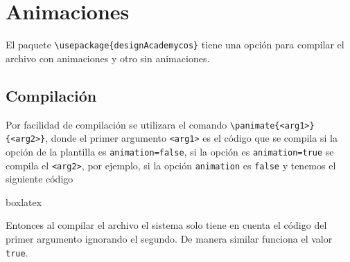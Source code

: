 {\justifying
\chapter{Animaciones}\label{cap:Animaciones}
%
	El paquete \verb|\usepackage{designAcademycos}| tiene una opción para compilar el archivo con animaciones y otro sin animaciones.
	\section{Compilación}
	Por facilidad de compilación se utilizara el comando \verb|\panimate{<arg1>}{<arg2>}|, donde el primer argumento \verb|<arg1>| es el código que se compila si la opción de la plantilla es \verb|animation=false|, si la opción es \verb|animation=true| se compila el \verb|<arg2>|, por ejemplo, si la opción \verb|animation| es \verb|false| y tenemos el siguiente código
	\begin{tcblisting}{boxlatex}
	\end{tcblisting}
	Entonces al compilar el archivo el sistema solo tiene en cuenta el código del primer argumento ignorando el segundo. De manera similar funciona el valor \verb|true|.
}
